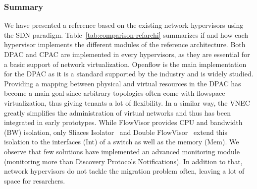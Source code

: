 \subsubsection{Summary}
We have presented a reference based on the existing network hypervisors using the SDN paradigm.
Table~\ref{tab:comparison-refarchi} summarizes if and how each hypervisor implements the different modules of the reference architecture.
Both DPAC and CPAC are implemented in every hypervisors, as they are essential for a basic support of network virtualization.
Openflow is the main implementation for the DPAC as it is a standard supported by the industry and is widely studied.
Providing a mapping between physical and virtual resources in the DPAC has become a main goal since arbitrary topologies often come with flowspace virtualization, thus giving tenants a lot of flexibility.
In a similar way, the VNEC greatly simplifies the administration of virtual networks and thus has been integrated in early prototypes.
While FlowVisor provides CPU and bandwidth (BW) isolation, only Sliaces Isolator~\cite{SlicesIsolator-El-Azzab2011} and Double FlowVisor~\cite{DoubleFV-Yin2013} extend this isolation to the interfaces (Int) of a switch as well as the memory (Mem).
We observe that few solutions have implemented an advanced monitoring module (\ie monitoring more than Discovery Protocols Notifications).
In addition to that, network hypervisors do not tackle the migration problem often, leaving a lot of space for resarchers.


